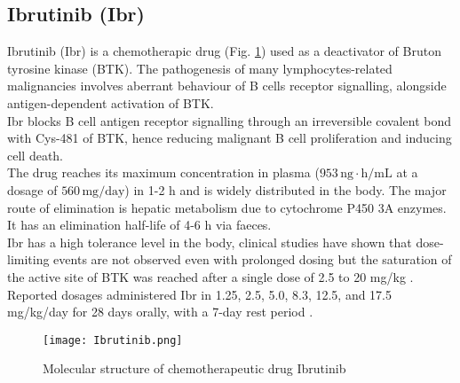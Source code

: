 \subsection{Ibrutinib (Ibr)}
Ibrutinib (Ibr) is a chemotherapic drug (Fig. \ref{fig:Ibr}) used as a deactivator of Bruton tyrosine kinase (BTK). The pathogenesis of many lymphocytes-related malignancies \cite{ibr-1} involves aberrant behaviour of B cells receptor signalling, alongside antigen-dependent activation of BTK.\\
Ibr blocks B cell antigen receptor signalling through an irreversible covalent bond with Cys-481 of BTK, hence reducing malignant B cell proliferation and inducing cell death.\\
The drug reaches its maximum concentration in plasma ($953\,\text{ng}\cdot\text{h}/\text{mL}$ at a dosage of $560\,\text{mg}/\text{day}$) in 1-2 h and is widely distributed in the body. The major route of elimination is hepatic metabolism due to cytochrome P450 3A enzymes. It has an elimination half-life of 4-6 h via faeces.\\
Ibr has a high tolerance level in the body, clinical studies have shown that dose-limiting events are not observed even with prolonged dosing \cite{ibr-2} but the saturation of the active site of BTK was reached after a single dose of 2.5 to 20 mg/kg \cite{ibr-pubchem}. Reported dosages administered Ibr in 1.25, 2.5, 5.0, 8.3, 12.5, and 17.5 mg/kg/day for 28 days orally, with a 7-day rest period \cite{ibr-2}.
\begin{figure}[htbp!]
	\centering
	\texttt{[image: Ibrutinib.png]}
	\caption{Molecular structure of chemotherapeutic drug Ibrutinib}
	\label{fig:Ibr}
\end{figure}

